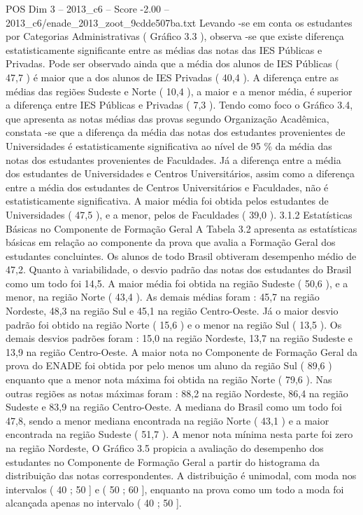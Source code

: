 \begin{textsample}{POS Dim 3 – 2013\_c6 – Score -2.00 – 2013\_c6/enade\_2013\_zoot\_9cdde507ba.txt}
Levando -se em conta os estudantes por Categorias Administrativas ( Gráfico 3.3 ), observa -se que existe diferença estatisticamente significante entre as médias das notas das IES Públicas e Privadas.
Pode ser observado ainda que a média dos alunos de IES Públicas ( 47,7 ) é maior que a dos alunos de IES Privadas ( 40,4 ).
A diferença entre as médias das regiões Sudeste e Norte ( 10,4 ), a maior e a menor média, é superior a diferença entre IES Públicas e Privadas ( 7,3 ).
Tendo como foco o Gráfico 3.4, que apresenta as notas médias das provas segundo Organização Acadêmica, constata -se que a diferença da média das notas dos estudantes provenientes de Universidades é estatisticamente significativa ao nível de 95 \% da média das notas dos estudantes provenientes de Faculdades.
Já a diferença entre a média dos estudantes de Universidades e Centros Universitários, assim como a diferença entre a média dos estudantes de Centros Universitários e Faculdades, não é estatisticamente significativa.
A maior média foi obtida pelos estudantes de Universidades ( 47,5 ), e a menor, pelos de Faculdades ( 39,0 ). 3.1.2 Estatísticas Básicas no Componente de Formação Geral A Tabela 3.2 apresenta as estatísticas básicas em relação ao componente da prova que avalia a Formação Geral dos estudantes concluintes.
Os alunos de todo Brasil obtiveram desempenho médio de 47,2.
Quanto à variabilidade, o desvio padrão das notas dos estudantes do Brasil como um todo foi 14,5.
A maior média foi obtida na região Sudeste ( 50,6 ), e a menor, na região Norte ( 43,4 ).
As demais médias foram : 45,7 na região Nordeste, 48,3 na região Sul e 45,1 na região Centro-Oeste.
Já o maior desvio padrão foi obtido na região Norte ( 15,6 ) e o menor na região Sul ( 13,5 ).
Os demais desvios padrões foram : 15,0 na região Nordeste, 13,7 na região Sudeste e 13,9 na região Centro-Oeste.
A maior nota no Componente de Formação Geral da prova do ENADE foi obtida por pelo menos um aluno da região Sul ( 89,6 ) enquanto que a menor nota máxima foi obtida na região Norte ( 79,6 ).
Nas outras regiões as notas máximas foram : 88,2 na região Nordeste, 86,4 na região Sudeste e 83,9 na região Centro-Oeste.
A mediana do Brasil como um todo foi 47,8, sendo a menor mediana encontrada na região Norte ( 43,1 ) e a maior encontrada na região Sudeste ( 51,7 ).
A menor nota mínima nesta parte foi zero na região Nordeste, O Gráfico 3.5 propicia a avaliação do desempenho dos estudantes no Componente de Formação Geral a partir do histograma da distribuição das notas correspondentes.
A distribuição é unimodal, com moda nos intervalos ( 40 ; 50 ] e ( 50 ; 60 ], enquanto na prova como um todo a moda foi alcançada apenas no intervalo ( 40 ; 50 ].

\end{textsample}
